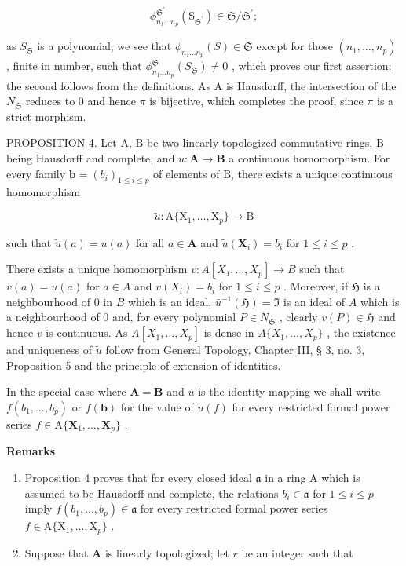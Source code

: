 \[
\phi_ {n _ {1} \dots n _ {p}} ^ {\mathfrak {S} ^ {\prime}} (\mathrm{S} _ {\mathfrak {S} ^ {\prime}}) \in \mathfrak {S} / \mathfrak {S} ^ {\prime};
\]

as \(S_{\mathfrak{S}}\) is a polynomial, we see that \(\phi_{n_{1}\ldots n_{p}}(S) \in \mathfrak{S}\) except for those \((n_{1}, \ldots, n_{p})\) , finite in number, such that \(\phi_{n_{1}\ldots n_{p}}^{\mathfrak{S}}(S_{\mathfrak{S}}) \neq 0\) , which proves our first assertion; the second follows from the definitions. As A is Hausdorff, the intersection of the \(N_{\mathfrak{S}}\) reduces to 0 and hence \(\pi\) is bijective, which completes the proof, since \(\pi\) is a strict morphism.

PROPOSITION 4. Let A, B be two linearly topologized commutative rings, B being Hausdorff and complete, and \(u: \mathbf{A} \to \mathbf{B}\) a continuous homomorphism. For every family \(\mathbf{b} = (b_i)_{1 \leq i \leq p}\) of elements of B, there exists a unique continuous homomorphism

\[
\tilde {u} \colon \mathrm{A} \{\mathrm{X} _ {1}, \dots , \mathrm{X} _ {p} \} \rightarrow \mathrm{B}
\]

such that \(\tilde{u}(a) = u(a)\) for all \(a \in \mathbf{A}\) and \(\tilde{u}(\mathbf{X}_i) = b_i\) for \(1 \leqslant i \leqslant p\) .

There exists a unique homomorphism \(v \colon A[X_1, \ldots, X_p] \to B\) such that \(v(a) = u(a)\) for \(a \in A\) and \(v(X_i) = b_i\) for \(1 \leqslant i \leqslant p\) . Moreover, if \(\mathfrak{H}\) is a neighbourhood of 0 in \(B\) which is an ideal, \(\bar{u}^{-1}(\mathfrak{H}) = \mathfrak{I}\) is an ideal of \(A\) which is a neighbourhood of 0 and, for every polynomial \(P \in N_{\mathfrak{S}}\) , clearly \(v(P) \in \mathfrak{H}\) and hence \(v\) is continuous. As \(A[X_1, \ldots, X_p]\) is dense in \(A\{X_1, \ldots, X_p\}\) , the existence and uniqueness of \(\tilde{u}\) follow from General Topology, Chapter III, § 3, no. 3, Proposition 5 and the principle of extension of identities.

In the special case where \(\mathbf{A} = \mathbf{B}\) and \(u\) is the identity mapping we shall write \(f(b_{1},\ldots ,b_{p})\) or \(f(\mathbf{b})\) for the value of \(\tilde{u} (f)\) for every restricted formal power series \(f\in \mathrm{A}\{\mathbf{X}_1,\dots ,\mathbf{X}_p\}\) .

\textbf{Remarks}\par

\begin{enumerate}
\def\labelenumi{(\arabic{enumi})}
\item
  Proposition 4 proves that for every closed ideal \(\mathfrak{a}\) in a ring A which is assumed to be Hausdorff and complete, the relations \(b_{i} \in \mathfrak{a}\) for \(1 \leqslant i \leqslant p\) imply \(f(b_{1}, \ldots, b_{p}) \in \mathfrak{a}\) for every restricted formal power series \(f \in \mathrm{A}\{\mathrm{X}_{1}, \ldots, \mathrm{X}_{p}\}\) .
\item
  Suppose that \(\mathbf{A}\) is linearly topologized; let \(r\) be an integer such that
\end{enumerate}


